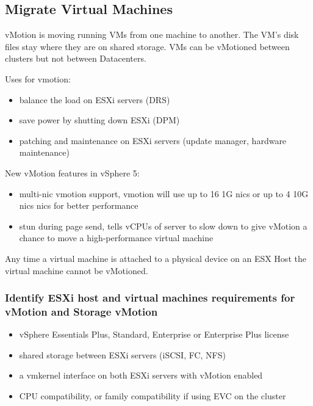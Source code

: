 \subsection{Migrate Virtual Machines}

vMotion is moving running VMs from one machine to another. The VM's disk files
stay where they are on shared storage. VMs can be vMotioned between clusters
but not between Datacenters.

Uses for vmotion:

\begin{itemize}
\item balance the load on ESXi servers (DRS)
\item save power by shutting down ESXi (DPM)
\item patching and maintenance on ESXi servers (update manager, hardware
maintenance)
\end{itemize}

New vMotion features in vSphere 5:

\begin{itemize}

\item multi-nic vmotion support, vmotion will use up to 16 1G nics or up to 4
10G nics nics for better performance

\item stun during page send, tells vCPUs of server to slow down to give
vMotion a chance to move a high-performance virtual machine

\end{itemize}

Any time a virtual machine is attached to a physical device on an ESX Host
the virtual machine cannot be vMotioned.

\subsubsection{Identify ESXi host and virtual machines requirements for vMotion and Storage vMotion}

\begin{itemize}
\item vSphere Essentials Plus, Standard, Enterprise or Enterprise Plus license
\item shared storage between ESXi servers (iSCSI, FC, NFS)
\item a vmkernel interface on both ESXi servers with vMotion enabled
\item CPU compatibility, or family compatibility if using EVC on the cluster
\end{itemize}

